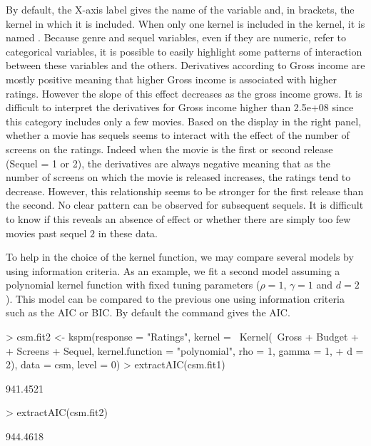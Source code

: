 By default, the X-axis label gives the name of the variable and, in brackets, the kernel in which it is included. When only one kernel is included in the kernel, it is named . Because genre and sequel variables, even if they are numeric, refer to categorical variables, it is possible to easily highlight some patterns of interaction between these variables and the others. Derivatives according to Gross income are mostly positive meaning that higher Gross income is associated with higher ratings. However the slope of this effect decreases as the gross income grows. It is difficult to interpret the derivatives for Gross income higher than 2.5e+08 since this category includes only a few movies. Based on the display in the right panel, whether a movie has sequels seems to interact with the effect of the number of screens on the ratings. Indeed when the movie is the first or second release (Sequel = 1 or 2), the derivatives are always negative meaning that as the number of screens on which the movie is released increases, the ratings tend to decrease. However, this relationship seems to be stronger for the first release than the second. No clear pattern can be observed for subsequent sequels. It is difficult to know if this reveals an absence of effect or whether there are simply too few movies past sequel $2$ in these data. 





To help in the choice of the kernel function, we may compare several models by using information criteria. As an example, we fit a second model assuming a polynomial kernel function with fixed tuning parameters ($\rho=1$, $\gamma=1$ and $d=2$). This model can be compared to the previous one using information criteria such as the AIC or BIC. By default the  command gives the AIC.


\begin{example}
> csm.fit2 <- kspm(response = "Ratings", kernel = ~Kernel(~Gross + Budget +
+    Screens + Sequel, kernel.function = "polynomial", rho = 1, gamma = 1,
+    d = 2), data = csm, level = 0)
> extractAIC(csm.fit1)
\end{example}
\begin{example}
[1] 941.4521
\end{example}
\begin{example}
> extractAIC(csm.fit2)
\end{example}
\begin{example}
[1] 944.4618
\end{example}


